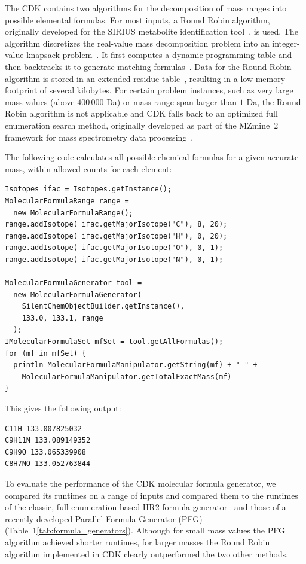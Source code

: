 \documentclass[10pt]{bmcart}
\begin{document}
  The CDK contains two algorithms for the decomposition of mass ranges into
possible elemental formulas. For most inputs, a Round Robin algorithm,
originally developed for the SIRIUS metabolite identification
tool~\cite{Bocker2009}, is used. The algorithm discretizes the real-value mass
decomposition problem into an integer-value knapsack
problem~\cite{Martello1990}. It first computes a dynamic programming table and
then backtracks it to generate matching formulas~\cite{Duehrkop2013,
Boecker2008}. Data for the Round Robin algorithm is stored in an extended
residue table~\cite{Bocker2005}, resulting in a low memory footprint of several
kilobytes. For certain problem instances, such as very large mass values (above
$400\,000$ Da) or mass range span larger than $1$ Da, the Round Robin algorithm
is not applicable and CDK falls back to an optimized full enumeration search
method, originally developed as part of the MZmine~2 framework for mass
spectrometry data processing~\cite{Pluskal2012, Pluskal2010}.

  The following code calculates all possible chemical formulas for a given
accurate mass, within allowed counts for each element:

\begin{verbatim}
Isotopes ifac = Isotopes.getInstance();
MolecularFormulaRange range =
  new MolecularFormulaRange();
range.addIsotope( ifac.getMajorIsotope("C"), 8, 20);
range.addIsotope( ifac.getMajorIsotope("H"), 0, 20);
range.addIsotope( ifac.getMajorIsotope("O"), 0, 1);
range.addIsotope( ifac.getMajorIsotope("N"), 0, 1);

MolecularFormulaGenerator tool =
  new MolecularFormulaGenerator(
    SilentChemObjectBuilder.getInstance(),
    133.0, 133.1, range
  );
IMolecularFormulaSet mfSet = tool.getAllFormulas();
for (mf in mfSet) {
  println MolecularFormulaManipulator.getString(mf) + " " +
    MolecularFormulaManipulator.getTotalExactMass(mf)
}
\end{verbatim}

This gives the following output:

\begin{verbatim}
C11H 133.007825032
C9H11N 133.089149352
C9H9O 133.065339908
C8H7NO 133.052763844
\end{verbatim}

   To evaluate the performance of the CDK molecular formula generator, we
compared its runtimes on a range of inputs and compared them to the runtimes of
the classic, full enumeration-based HR2 formula generator~\cite{Kind2007} and
those of a recently developed Parallel Formula Generator (PFG)~\cite{Zhang2016}
(Table~1\ref{tab:formula_generators}). Although for small mass values the PFG
algorithm achieved shorter runtimes, for larger masses the Round Robin
algorithm implemented in CDK clearly outperformed the two other methods.
\end{document}
